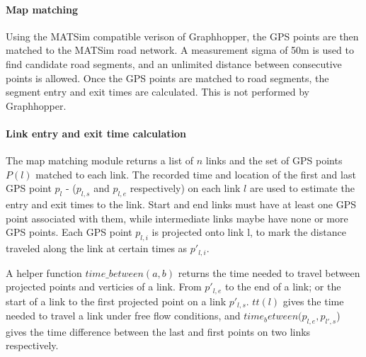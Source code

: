 \paragraph{Map matching}
Using the MATSim compatible verison of Graphhopper, the GPS points are then matched to the MATSim road network. A measurement sigma of 50m is used to find candidate road segments, and an unlimited distance between consecutive points is allowed. Once the GPS points are matched to road segments, the segment entry and exit times are calculated. This is not performed by Graphhopper.  

\paragraph{Link entry and exit time calculation}
The map matching module returns a list of $n$ links and the set of GPS points $P(l)$ matched to each link. The recorded time and location of the first and last GPS point $p_{l}$ - ($p_{l,s}$ and $p_{l,e}$ respectively) on each link $l$ are used to estimate the entry and exit times to the link. 
Start and end links must have at least one GPS point associated with them, while intermediate links maybe have none or more GPS points. 
Each GPS point $p_{l,i}$ is projected onto link l, to mark the distance traveled along the link at certain times as $p'_{l,i}$.

A helper function $time\_between(a,b)$ returns the time needed to travel between projected points and verticies of a link. From $p'_{l,e}$ to the end of a link; or the start of a link to the first projected point on a link $p'_{l,s}$. 
$tt(l)$ gives the time needed to travel a link under free flow conditions, and $time_between(p_{l,e}, p_{l',s}$) gives the time difference between the last and first points on two links respectively.

